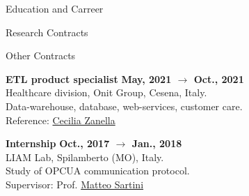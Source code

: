 \documentclass{resume} %
\begin{document}
\begin{rSection}{Education and Carreer}
\begin{rSubsection2}{Research Contracts}
        \end{rSubsection2}


        \begin{rSubsection2}{Other Contracts}

            \item\textbf{ ETL product specialist }\hfill \textbf{May, 2021 $\rightarrow$ Oct., 2021}
            \\Healthcare division, Onit Group, Cesena, Italy.
            \\Data-warehouse, database, web-services, customer care.
            \\Reference: \href{mailto:czanella@onit.it}{Cecilia Zanella}
            \item\textbf{ Internship }\hfill \textbf{Oct., 2017 $\rightarrow$ Jan., 2018}
            \\LIAM Lab, Spilamberto (MO), Italy.
            \\Study of OPCUA communication protocol.
            \\Supervisor: Prof. \href{mailto:matteo.sartini@unibo.it}{Matteo Sartini}

        \end{rSubsection2}


    \end{rSection}


\end{document}
